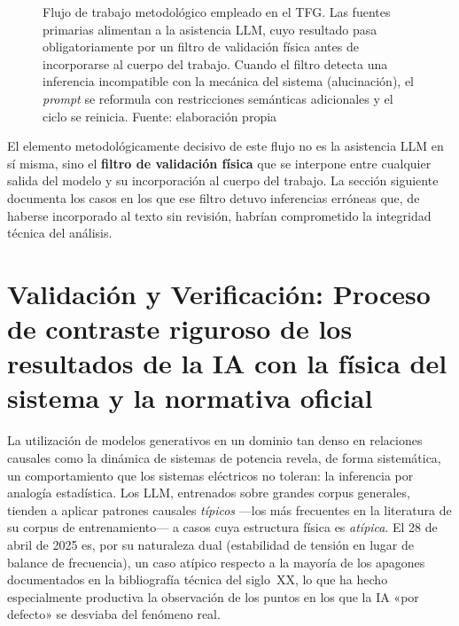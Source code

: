 \begin{figure}[H]
{%
    }
    \caption[Flujo de trabajo de la asistencia por IA con bucle de validaci\'on f\'isica.]{Flujo de trabajo metodol\'ogico empleado en el TFG. Las fuentes primarias alimentan a la asistencia LLM, cuyo resultado pasa obligatoriamente por un filtro de validaci\'on f\'isica antes de incorporarse al cuerpo del trabajo. Cuando el filtro detecta una inferencia incompatible con la mec\'anica del sistema (alucinaci\'on), el \textit{prompt} se reformula con restricciones sem\'anticas adicionales y el ciclo se reinicia. Fuente: elaboraci\'on propia}
    \label{fig:workflow_ia}
\end{figure}

El elemento metodológicamente decisivo de este flujo no es la asistencia LLM
en sí misma, sino el \textbf{filtro de validación física} que se interpone
entre cualquier salida del modelo y su incorporación al cuerpo del trabajo.
La sección siguiente documenta los casos en los que ese filtro detuvo
inferencias erróneas que, de haberse incorporado al texto sin revisión,
habrían comprometido la integridad técnica del análisis.

\section{Validación y Verificación: Proceso de contraste riguroso de los
resultados de la IA con la física del sistema y la normativa oficial}
\label{sec:validacion_ia}

La utilización de modelos generativos en un dominio tan denso en relaciones
causales como la dinámica de sistemas de potencia revela, de forma sistemática,
un comportamiento que los sistemas eléctricos no toleran: la inferencia por
analogía estadística. Los LLM, entrenados sobre grandes corpus generales,
tienden a aplicar patrones causales \textit{típicos} ---los más frecuentes en
la literatura de su corpus de entrenamiento--- a casos cuya estructura física
es \textit{atípica}. El 28 de abril de 2025 es, por su naturaleza dual
(estabilidad de tensión en lugar de balance de frecuencia), un caso atípico
respecto a la mayoría de los apagones documentados en la bibliografía técnica
del siglo~XX, lo que ha hecho especialmente productiva la observación de los
puntos en los que la IA «por defecto» se desviaba del fenómeno real.

